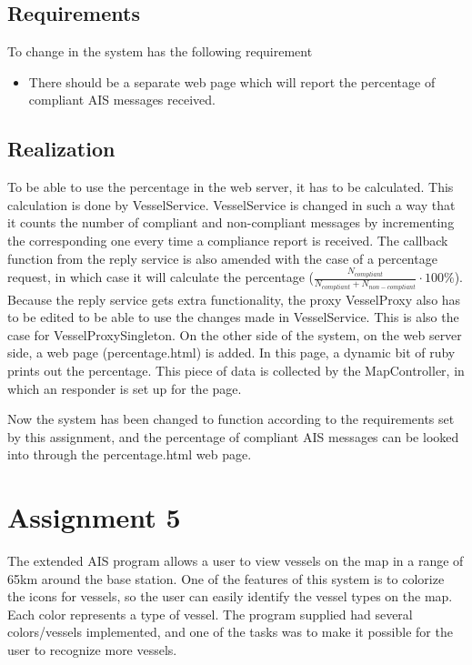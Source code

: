 \documentclass[12pt]{article}
\begin{document}
\subsection*{Requirements}
To change in the system has the following requirement
\begin{itemize}
\item There should be a separate web page which will report the percentage of compliant AIS messages received.
\end{itemize}

\subsection*{Realization}
To be able to use the percentage in the web server, it has to be calculated. This calculation is done by VesselService. VesselService is changed in such a way that it counts the number of compliant and non-compliant messages by incrementing the corresponding one every time a compliance report is received. The callback function from the reply service is also amended with the case of a percentage request, in which case it will calculate the percentage ($\frac{N_{compliant}}{N_{compliant}+N_{non-compliant}}\cdot100\%$). Because the reply service gets extra functionality, the proxy VesselProxy also has to be edited to be able to use the changes made in VesselService. This is also the case for VesselProxySingleton. On the other side of the system, on the web server side, a web page (percentage.html) is added. In this page, a dynamic bit of ruby prints out the percentage. This piece of data is collected by the MapController, in which an responder is set up for the page.

Now the system has been changed to function according to the requirements set by this assignment, and the percentage of compliant AIS messages can be looked into through the percentage.html web page.

\section*{Assignment 5}
The extended AIS program allows a user to view vessels on the map in a range of 65km around the base station. One of the features of this system is to colorize the icons for vessels, so the user can easily identify the vessel types on the map. Each color represents a type of vessel. The program supplied had several colors/vessels implemented, and one of the tasks was to make it possible for the user to recognize more vessels.
\end{document}
